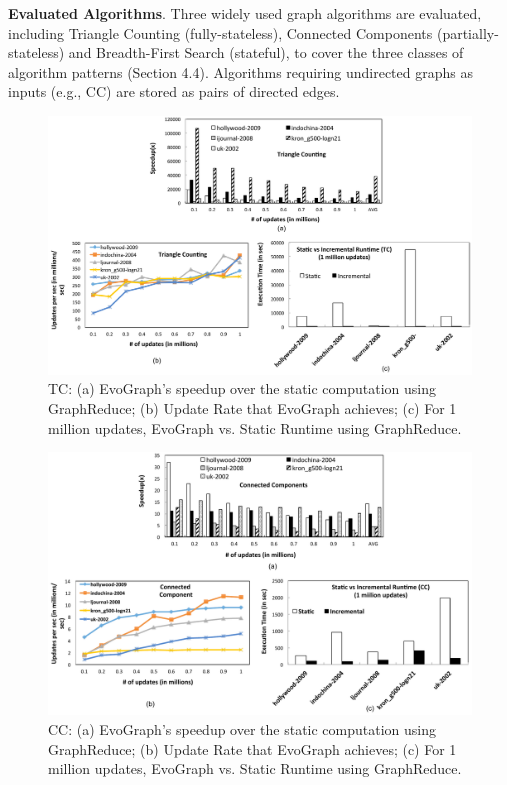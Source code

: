 \textbf{Evaluated Algorithms}. Three widely used graph algorithms are evaluated, including Triangle Counting (fully-stateless), Connected Components (partially-stateless) and Breadth-First Search (stateful), to cover the three classes of algorithm patterns (Section 4.4). Algorithms requiring undirected graphs as inputs (e.g., CC) are stored as pairs of directed edges.

\begin{figure}[!t]
\centering
\includegraphics [width=1\columnwidth]{figures/exp3.pdf}
\caption{TC: (a) EvoGraph's speedup over the static computation using GraphReduce; (b) Update Rate that EvoGraph achieves; (c) For 1 million updates, EvoGraph vs. Static Runtime using GraphReduce. }
\label{fig:exp3}
\end{figure}

\begin{figure}[!t]
\centering
\includegraphics [width=1\columnwidth]{figures/exp2.pdf}
\caption{CC: (a) EvoGraph's speedup over the static computation using GraphReduce; (b) Update Rate that EvoGraph achieves; (c) For 1 million updates, EvoGraph vs. Static Runtime using GraphReduce. }
\label{fig:exp2}
\end{figure}

